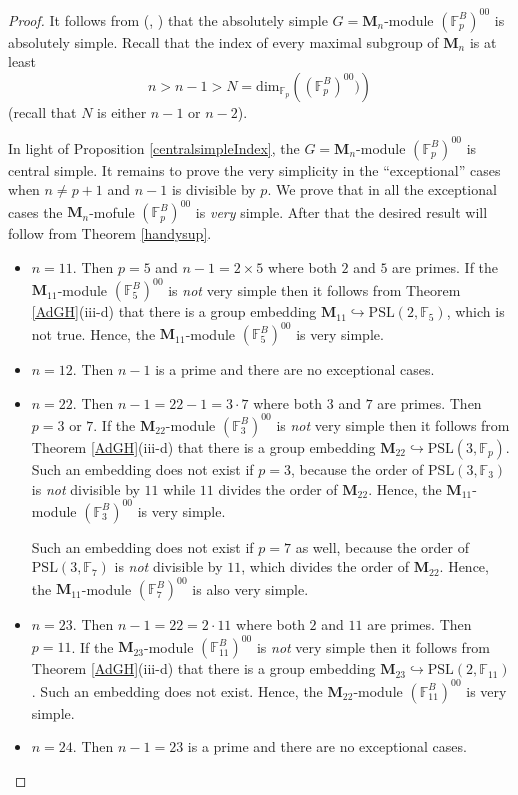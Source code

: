 \documentclass[12pt,a4paper,reqno]{amsart}
\def\R{{\mathbb R}}
\def\F{{\mathbb F}}
\def\R{{\mathfrak R}}
\def\Gal{\mathrm{Gal}}
\def\dim{\mathrm{dim}}
\theoremstyle{definition}
\begin{document}
\begin{proof}

It follows from (\cite{Klemm}, \cite[Table 1]{Mortimer})  that
the  absolutely simple $G=\mathbf{M}_n$-module $(\F_p^{B})^{00}$ is absolutely simple.
Recall \cite{Atlas} that the index of every maximal subgroup of $\mathbf{M}_n$ is at least 
$$n>n-1 >N=\dim_{\F_p}\left((\F_p^{B})^{00})\right)$$
(recall that $N$ is either $n-1$ or $n-2$).


In light of Proposition \ref{centralsimpleIndex}, the $G=\mathbf{M}_n$-module $(\F_p^{B})^{00}$ is central simple.
It remains to prove the very simplicity in
 the ``exceptional'' cases when $n \ne p+1$ and $n-1$ is divisible by $p$.
We prove that in all the exceptional  cases the $\mathbf{M}_n$-mofule $(\F_p^{B})^{00}$ is {\sl very} simple. After that the desired
result will follow from Theorem  \ref{handysup}.
\begin{itemize}
\item
$n=11$. Then $p=5$ and $n-1=2 \times 5$ where both $2$ and $5$ are primes. If the $\mathbf{M}_{11}$-module $(\F_5^{B})^{00}$ 
is {\sl not} very simple then it follows from Theorem \ref{AdGH}(iii-d)  that there is a group embedding $\mathbf{M}_{11}\hookrightarrow \mathrm{PSL}(2,\F_5)$, which is not true.
Hence, the $\mathbf{M}_{11}$-module $(\F_5^{B})^{00}$ 
is  very simple. 
\item
$n=12$. Then $n-1$ is a prime and there are no exceptional cases.
\item
$n=22$. Then $n-1=22-1=3\cdot 7$ where both $3$ and $7$ are primes.  Then $p=3$ or $7$. If the $\mathbf{M}_{22}$-module $(\F_{3}^{B})^{00}$  
is {\sl not} very simple then  it follows from Theorem \ref{AdGH}(iii-d)  that 
there is a group embedding $\mathbf{M}_{22}\hookrightarrow \mathrm{PSL}(3,\F_p)$. Such an embedding does not exist
if $p=3$, because the order of $\mathrm{PSL}(3,\F_3)$ is {\sl not} divisible by $11$ while $11$ divides the order of $\mathbf{M}_{22}$.
Hence, the $\mathbf{M}_{11}$-module $(\F_3^{B})^{00}$ 
is  very simple.

 Such an embedding does not exist
if $p=7$ as well, because the order of $\mathrm{PSL}(3,\F_7)$ is {\sl not} divisible by $11$, which divides the order of $\mathbf{M}_{22}$.
Hence, the $\mathbf{M}_{11}$-module $(\F_7^{B})^{00}$  
is also  very simple.
\item
$n=23$. Then $n-1=22=2\cdot 11$ where both $2$ and $11$ are primes. Then $p=11$. If the $\mathbf{M}_{23}$-module $(\F_{11}^{B})^{00}$  
is {\sl not} very simple then  it follows from Theorem \ref{AdGH}(iii-d)  that 
 there is a group embedding $\mathbf{M}_{23}\hookrightarrow \mathrm{PSL}(2,\F_{11})$. Such an embedding does not exist.
Hence, the $\mathbf{M}_{22}$-module  $(\F_{11}^{B})^{00}$  
is  very simple.
\item
$n=24$. Then $n-1=23$ is a prime and there are no exceptional cases.
\end{itemize}
\end{proof}
\end{document}
